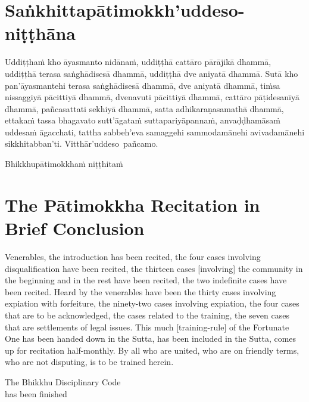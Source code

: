 
\section{Saṅkhittapātimokkh'uddeso-niṭṭhāna}
\label{sankhittapatimokkh'uddeso-nitthana}

\ifafiveversion\vspace{0.15cm}\fi
\ifninebythirteenversion\vspace{0.15cm}\fi

Uddiṭṭhaṁ kho āyasmanto nidānaṁ, uddiṭṭhā cattāro pārājikā dhammā, uddiṭṭhā terasa saṅghādisesā dhammā, uddiṭṭhā dve aniyatā dhammā. Sutā kho pan'āyasmantehi terasa saṅghādisesā dhammā, dve aniyatā dhammā, tiṁsa nissaggiyā pācittiyā dhammā, dvenavuti pācittiyā dhammā, cattāro pāṭidesanīyā dhammā, pañcasattati sekhiyā dhammā, satta adhikaraṇasamathā dhammā, ettakaṁ tassa bhagavato sutt'āgataṁ suttapariyāpannaṁ, anvaḍḍhamāsaṁ uddesaṁ āgacchati, tattha sabbeh'eva samaggehi sammodamānehi avivadamānehi sikkhitabban'ti.
Vitthār'uddeso pañcamo.

\begin{outro}
	Bhikkhupātimokkhaṁ niṭṭhitaṁ
\end{outro}

\clearpage



\section{The Pātimokkha Recitation in Brief Conclusion}
\label{patimokkha-in-brief-conclusion}

\ifafiveversion\vspace{0.15cm}\fi
\ifninebythirteenversion\vspace{0.15cm}\fi

Venerables, the introduction has been recited, the four cases involving disqualification have been recited, the thirteen cases [involving] the community in the beginning and in the rest have been recited, the two indefinite cases have been recited. Heard by the venerables have been the thirty cases involving expiation with forfeiture, the ninety-two cases involving expiation, the four cases that are to be acknowledged, the cases related to the training, the seven cases that are settlements of legal issues. This much [training-rule] of the Fortunate One has been handed down in the Sutta, has been included in the Sutta, comes up for recitation half-monthly. By all who are united, who are on friendly terms, who are not disputing, is to be trained herein.

\begin{outro}
	The Bhikkhu Disciplinary Code \ifninebythirteenversion\\\fi has been finished
\end{outro}

\clearpage


